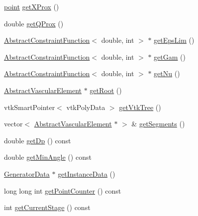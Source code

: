 \begin{DoxyCompactItemize}
\item 
\hyperlink{structpoint}{point} \hyperlink{class_abstract_object_c_c_o_tree_a81862bcbe6e223d216079b1522ad0db1}{get\+X\+Prox} ()
\item 
double \hyperlink{class_abstract_object_c_c_o_tree_a81336407d6138888b916f12d75e7ae74}{get\+Q\+Prox} ()
\item 
\hyperlink{class_abstract_constraint_function}{Abstract\+Constraint\+Function}$<$ double, int $>$ $\ast$ \hyperlink{class_abstract_object_c_c_o_tree_a08cb14298e5ab481a9540b5487db54b0}{get\+Eps\+Lim} ()
\item 
\hyperlink{class_abstract_constraint_function}{Abstract\+Constraint\+Function}$<$ double, int $>$ $\ast$ \hyperlink{class_abstract_object_c_c_o_tree_ad97518a157cf02e69ef931044251d349}{get\+Gam} ()
\item 
\hyperlink{class_abstract_constraint_function}{Abstract\+Constraint\+Function}$<$ double, int $>$ $\ast$ \hyperlink{class_abstract_object_c_c_o_tree_aa1ee6820dc34e0aa9f5797c86ed41ee4}{get\+Nu} ()
\item 
\hyperlink{class_abstract_vascular_element}{Abstract\+Vascular\+Element} $\ast$ \hyperlink{class_abstract_object_c_c_o_tree_a98a758f4b6fd1528e8105f46867e60c3}{get\+Root} ()
\item 
vtk\+Smart\+Pointer$<$ vtk\+Poly\+Data $>$ \hyperlink{class_abstract_object_c_c_o_tree_afb5faccc7f05d32bcfd6f97937b7fb6c}{get\+Vtk\+Tree} ()
\item 
vector$<$ \hyperlink{class_abstract_vascular_element}{Abstract\+Vascular\+Element} $\ast$ $>$ \& \hyperlink{class_abstract_object_c_c_o_tree_ad433934b1a05fe01176eafaa52556db3}{get\+Segments} ()
\item 
double \hyperlink{class_abstract_object_c_c_o_tree_a71e56a3920535ed6fddffdbffe53773d}{get\+Dp} () const 
\item 
double \hyperlink{class_abstract_object_c_c_o_tree_a9eb5c7f714caf875dedbe0181ebb376f}{get\+Min\+Angle} () const 
\item 
\hyperlink{class_generator_data}{Generator\+Data} $\ast$ \hyperlink{class_abstract_object_c_c_o_tree_a2088df2b807ea7cff5c03b28025e4891}{get\+Instance\+Data} ()
\item 
long long int \hyperlink{class_abstract_object_c_c_o_tree_a56872932997c02693841597baabfd541}{get\+Point\+Counter} () const 
\item 
int \hyperlink{class_abstract_object_c_c_o_tree_a898a98d082f14787fab5f33f8434145e}{get\+Current\+Stage} () const 
\item 

\end{DoxyCompactItemize}
